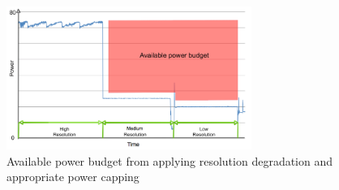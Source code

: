 \begin{figure}[H]
	\centering
    \includegraphics[width=8cm]{figs/Available_power_budget.png}
        \caption{Available power budget from applying resolution degradation and appropriate power capping}
        \label{fig:Available_power_budget}
\end{figure}




















































